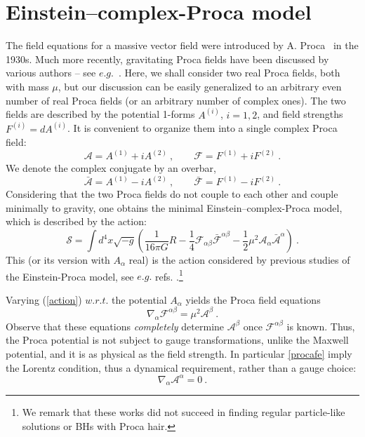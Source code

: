 \section{Einstein--complex-Proca model}
\label{sec_model}
The field equations for a massive vector field were introduced by A. Proca~\cite{Proca} in the 1930s. Much more recently, gravitating Proca fields have been discussed by various authors -- see $e.g.$~\cite{Rosen:1994rq,Obukhov:1999ed,Toussaint:1999zz}. Here, we shall consider  two real Proca fields, both with mass $\mu$, but our discussion can be easily generalized to an arbitrary even number of real Proca fields (or an arbitrary number of complex ones). 
The two fields are described by the potential 1-forms $A^{(i)}$, $i=1,2$, and field strengths $F^{(i)}=dA^{(i)}$. It is convenient to organize them into a single complex Proca field:
\begin{equation}
\mathcal{A}=A^{(1)}+iA^{(2)} \ , \qquad \mathcal{F}=F^{(1)}+iF^{(2)} \ .
\end{equation}
We denote the complex conjugate by an overbar,
\begin{equation}
\bar{\mathcal{A}}=A^{(1)}-iA^{(2)} \ , \qquad \bar{\mathcal{F}}=F^{(1)}-iF^{(2)} \ .
\end{equation}
Considering that the two Proca fields do not couple to each other and couple minimally to gravity, one obtains the minimal Einstein--complex-Proca model, which is  
described by the action:
\begin{equation}
\label{action}
\mathcal{S}=\int d^4x \sqrt{-g}\left(\frac{1}{16 \pi  G}R
-\frac{1}{4}\mathcal{F}_{\alpha\beta}\bar{\mathcal{F}}^{\alpha\beta}
-\frac{1}{2}\mu^2\mathcal{A}_\alpha\bar{\mathcal{A}}^\alpha\right) \ .
\end{equation}
This (or its version with $A_\alpha$ real) 
is the action considered by previous studies of the Einstein-Proca model, see
$e.g.$ refs. \cite{Rosen:1994rq,Vuille:2002qz}.\footnote{We remark that these works did not succeed in finding regular particle-like solutions or BHs with Proca hair.}



Varying  (\ref{action}) $w.r.t.$ the potential $A_\alpha$ yields the Proca field equations
\begin{equation}
\nabla_\alpha\mathcal{F}^{\alpha\beta}=\mu^2 \mathcal{A}^\beta \ .
\label{procafe}
\end{equation}
Observe that these equations \textit{completely} determine $ \mathcal{A}^\beta$ once $\mathcal{F}^{\alpha\beta}$ is known. Thus, the Proca potential is not subject to gauge transformations, unlike the Maxwell potential, and it is as physical as the field strength. In particular \eqref{procafe} imply the Lorentz condition, thus a dynamical requirement, rather than a gauge choice:
\begin{equation}
\nabla_\alpha\mathcal{A}^\alpha = 0 \ .
\label{lorentz}
\end{equation}


